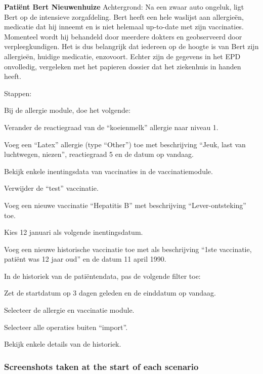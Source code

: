     \noindent\textbf{Pati\"{e}nt Bert Nieuwenhuize}\newline
    Achtergrond: Na een zwaar auto ongeluk, ligt Bert op de intensieve zorgafdeling. Bert heeft een hele waslijst aan allergie\"{e}n, medicatie dat hij inneemt en is niet helemaal up-to-date met zijn vaccinaties. Momenteel wordt hij behandeld door meerdere dokters en geobserveerd door verpleegkundigen. Het is dus belangrijk dat iedereen op de hoogte is van Bert zijn allergie\"{e}n, huidige medicatie, enzovoort. Echter zijn de gegevens in het EPD onvolledig, vergeleken met het papieren dossier dat het ziekenhuis in handen heeft.\medskip

    \noindent Stappen:
    \vspace{-6pt}
    \begin{myenumerate}
        \item Bij de allergie module, doe het volgende:
        \begin{myenumerate}
            \item Verander de reactiegraad van de ``koeienmelk'' allergie naar niveau 1.
            \item Voeg een ``Latex'' allergie (type ``Other'') toe met beschrijving ``Jeuk, last van luchtwegen, niezen'', reactiegraad 5 en de datum op vandaag.
        \end{myenumerate}
        \item Bekijk enkele inentingsdata van vaccinaties in de vaccinatiemodule.
        \begin{myenumerate}
            \item Verwijder de ``test'' vaccinatie.
            \item Voeg een nieuwe vaccinatie ``Hepatitis B''  met beschrijving ``Lever-ontsteking'' toe.
            \begin{myenumerate}
                \item Kies 12 januari als volgende inentingsdatum.
                \item Voeg een nieuwe historische vaccinatie toe met als beschrijving ``1ste vaccinatie, pati\"{e}nt was 12 jaar oud'' en de datum 11 april 1990.
            \end{myenumerate}
        \end{myenumerate}
        \item In de historiek van de pati\"{e}ntendata, pas de volgende filter toe:
        \begin{myenumerate}
            \item Zet de startdatum op 3 dagen geleden en de einddatum op vandaag.
            \item Selecteer de allergie en vaccinatie module.
            \item Selecteer alle operaties buiten ``import''.
            \item Bekijk enkele details van de historiek.
        \end{myenumerate}
    \end{myenumerate}

    \subsubsection{Screenshots taken at the start of each scenario}\label{appendix_test_screens}